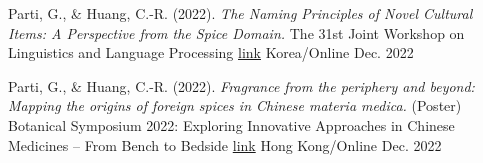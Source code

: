 
\begin{cventries}

  \cventry
    {Parti, G., \& Huang, C.-R. (2022). \textit{The Naming Principles of Novel Cultural Items: A Perspective from the Spice Domain.}} %
    {The 31st Joint Workshop on Linguistics and Language Processing \href{https://jwllp31.github.io/program/}{link}} %
    {Korea/Online} %
    {Dec. 2022} %
    {
    }


  \cventry
    {Parti, G., \& Huang, C.-R. (2022). \textit{Fragrance from the periphery and beyond: Mapping the origins of foreign spices in Chinese materia medica.} (Poster)} %
    {Botanical Symposium 2022: Exploring Innovative Approaches in Chinese Medicines -- From Bench to Bedside \href{https://event.fourwaves.com/botanicalsymposium2022/abstracts/1ea06222-f8a6-400c-8c92-de4e419a56f3}{link}} %
    {Hong Kong/Online} %
    {Dec. 2022} %
    {
    }

\end{cventries}
